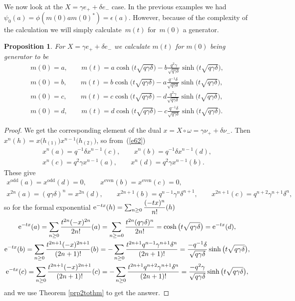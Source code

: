 \documentclass[10pt,a4paper]{amsart}
\numberwithin{equation}{section}
\newtheorem{Proposition}[Theorem]{Proposition}
 { \theoremstyle{definition}
\newtheorem{Definition}[Theorem]{Definition}
\newtheorem{Note}[Theorem]{Note}
\newtheorem{Example}[Theorem]{Example}
\newtheorem{Remark}[Theorem]{Remark} }
\newcommand{\<}{\langle}
\renewcommand{\>}{\rangle}
\begin{document}
 We now look at the $ X=\gamma e_{+}+\delta e_{-} $ case. In the previous examples we had $ \psi_0(a) =\phi (m(0) a m(0)^{*}) \allowbreak =\epsilon(a)$. However, because of the complexity of the calculation we will simply calculate~$ m(t) $ for~$ m(0)$ a generator.
 \begin{Proposition} \label{P7}
 For $ X= \gamma e_{+} + \delta e_{-} $ we calculate $ m(t) $ for $ m (0) $ being generator to be
 \begin{gather*}
 		m(0)=a, \qquad m(t)=	a \cosh \big(t\sqrt{q \gamma \delta}\big)-b\frac{q^{2} \gamma}{\sqrt{q \gamma \delta}} \sinh \big(t\sqrt{q \gamma \delta}\big),\\
 	m(0)=b, \qquad m(t)= 	b\cosh \big(t\sqrt{q \gamma \delta}\big)-a\frac{q^{-1} \delta}{\sqrt{q \gamma \delta}} \sinh \big(t\sqrt{q \gamma \delta}\big),\\
 	m(0)=c, \qquad m(t)= c\cosh \big(t\sqrt{q \gamma \delta}\big)-d\frac{q^{2} \gamma}{\sqrt{q \gamma \delta}} \sinh \big(t\sqrt{q \gamma \delta}\big),\\
 	m(0)=d, \qquad m(t)= d\cosh \big(t\sqrt{q \gamma \delta}\big)-c\frac{q^{-1} \delta}{\sqrt{q \gamma \delta}} \sinh \big(t\sqrt{q \gamma \delta}\big).
 \end{gather*}
 \end{Proposition}
\begin{proof}
	We get the corresponding element of the dual $ x=X\circ \omega= \gamma \nu_{+} + \delta \nu_{-} $. Then $ x^{n}(h)=x\big(h_{(1)}\big) x^{n-1}\big(h_{(2)}\big) $, so from~(\ref{e62})
	\begin{gather*}
		x^{n}(a)=q^{-1} \delta x^{n-1}(c), \qquad 	x^{n}(b)=q^{-1} \delta x^{n-1}(d), \\ 	x^{n}(c)=q^{2} \gamma x^{n-1}(a), \qquad x^{n}(d)=q^{2} \gamma x^{n-1}(b).
	\end{gather*}
	These give
	\begin{gather*}
	x^{\text{odd}}(a)=	x^{\text{odd}}(d)=0, \qquad x^{\text{even}}(b)=	x^{\text{even}}(c)=0, \\
	x^{2n}(a)=(q \gamma \delta )^{n}=x^{2n}(d), \qquad
		x^{2n+1}(b)=q ^{n-1}\gamma^{n} \delta ^{n+1}, \qquad 	x^{2n+1}(c)=q ^{n+2}\gamma^{n+1} \delta ^{n},
	\end{gather*}
	so for the formal exponential $ {\rm e}^{-tx} (h)= \sum_{n\geq 0} \dfrac{(-tx)^{n}}{n!}(h)$
	\begin{gather*}
		{\rm e}^{-tx} (a)= \sum_{n\geq 0} \dfrac{t^{2n}(-x)^{2n}}{2n!}(a)= \sum_{n\geq =0} \dfrac{t^{2n}(q \gamma \delta)^{n}}{2n!}=\cosh \big(t\sqrt{q \gamma \delta}\big)={\rm e}^{-tx} (d),\\
		{\rm e}^{-tx} (b)= \sum_{n\geq 0} \dfrac{t^{2n+1}(-x)^{2n+1}}{(2n+1)!}(b)= -\sum_{n\geq 0} \dfrac{t^{2n+1} q^{n-1} \gamma ^{n+1}\delta^{n}}{(2n+1)!}=\frac{-q^{-1} \delta}{\sqrt{q \gamma \delta}}\sinh \big(t\sqrt{q \gamma \delta}\big),\\
		{\rm e}^{-tx} (c)= \sum_{n\geq 0} \dfrac{t^{2n+1}(-x)^{2n+1}}{(2n+1)!}(c)= -\sum_{n\geq 0} \dfrac{t^{2n+1} q^{n+2} \gamma ^{n+1}\delta^{n}}{(2n+1)!}=\frac{-q^{2} \gamma}{\sqrt{q \gamma \delta}}\sinh \big(t\sqrt{q \gamma \delta}\big),
	\end{gather*}
and we use Theorem \ref{prp2tothm} to get the answer.
\end{proof}
\end{document}
